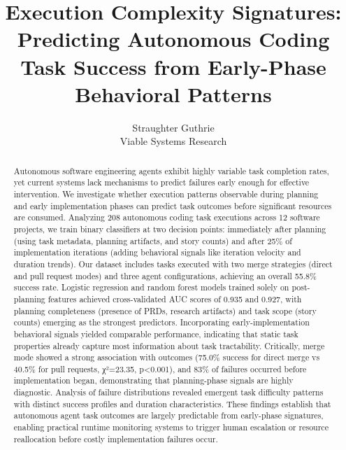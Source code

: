 \documentclass[]{article}
\begin{document}
\title{Execution Complexity Signatures: Predicting Autonomous Coding Task Success from Early-Phase Behavioral Patterns}

\author{
Straughter Guthrie\\
Viable Systems Research
}

\maketitle
\begin{abstract}
Autonomous software engineering agents exhibit highly variable task completion rates, yet current systems lack mechanisms to predict failures early enough for effective intervention. We investigate whether execution patterns observable during planning and early implementation phases can predict task outcomes before significant resources are consumed. Analyzing 208 autonomous coding task executions across 12 software projects, we train binary classifiers at two decision points: immediately after planning (using task metadata, planning artifacts, and story counts) and after 25\% of implementation iterations (adding behavioral signals like iteration velocity and duration trends). Our dataset includes tasks executed with two merge strategies (direct and pull request modes) and three agent configurations, achieving an overall 55.8\% success rate. Logistic regression and random forest models trained solely on post-planning features achieved cross-validated AUC scores of 0.935 and 0.927, with planning completeness (presence of PRDs, research artifacts) and task scope (story counts) emerging as the strongest predictors. Incorporating early-implementation behavioral signals yielded comparable performance, indicating that static task properties already capture most information about task tractability. Critically, merge mode showed a strong association with outcomes (75.0\% success for direct merge vs 40.5\% for pull requests, χ²=23.35, p<0.001), and 83\% of failures occurred before implementation began, demonstrating that planning-phase signals are highly diagnostic. Analysis of failure distributions revealed emergent task difficulty patterns with distinct success profiles and duration characteristics. These findings establish that autonomous agent task outcomes are largely predictable from early-phase signatures, enabling practical runtime monitoring systems to trigger human escalation or resource reallocation before costly implementation failures occur.
\end{abstract}
\end{document}
